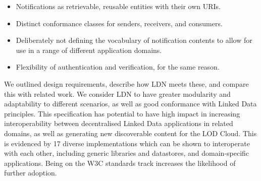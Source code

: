 \documentclass[a4paper]{llncs}
\begin{document}
                            \begin{itemize}
  \item Notifications as retrievable, reusable entities with their own URIs.\item Distinct conformance classes for senders, receivers, and consumers.\item Deliberately not defining the vocabulary of notification contents to allow for use in a range of different application domains.\item Flexibility of authentication and verification, for the same reason.
    \end{itemize}
  

                            
\par We outlined design requirements, describe how LDN meets these, and compare this with related work. We consider LDN to have greater modularity and adaptability to different scenarios, as well as good conformance with Linked Data principles. This specification has potential to have high impact in increasing interoperability between decentralised Linked Data applications in related domains, as well as generating new discoverable content for the LOD Cloud. This is evidenced by 17 diverse implementations which can be shown to interoperate with each other, including generic libraries and datastores, and domain-specific applications. Being on the W3C standards track increases the likelihood of further adoption.

                            
                            
                        
                    

                    
                        
\end{document}
